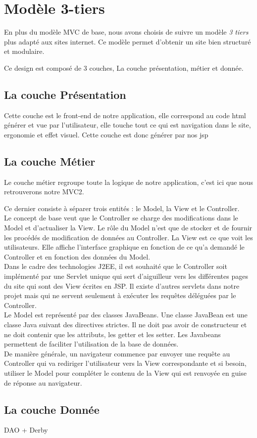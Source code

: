 \section{Modèle 3-tiers}
En plus du modèle MVC de base, nous avons choisis de suivre un modèle \emph{3 tiers} plus adapté aux sites internet.
Ce modèle permet d'obtenir un site bien structuré et modulaire.

Ce design est composé de 3 couches,
La couche présentation, métier et donnée.

\subsection{La couche Présentation}
Cette couche est le front-end de notre application, elle correspond au code html générer et vue par l'utilisateur, elle touche tout ce qui est navigation dans le site, ergonomie et effet visuel.
Cette couche est donc générer par nos jsp

\subsection{La couche Métier}
Le couche métier regroupe toute la logique de notre application, c'est ici que nous retrouverons notre MVC2.

Ce dernier consiste à séparer trois 
entités : le Model, la View et le Controller. \\

Le concept de base veut que le Controller se charge des modifications dans le 
Model et d'actualiser la View. Le rôle du Model n'est que de stocker et de 
fournir les procédés de modification de données au Controller. La View est ce 
que voit les utilisateurs. Elle affiche l'interface graphique en fonction de ce 
qu'a demandé le Controller et en fonction des données du Model. \\

Dans le cadre des technologies J2EE, il est souhaité que le Controller soit 
implémenté par une Servlet unique qui sert d'aiguilleur vers les différentes 
pages du site qui sont des View écrites en JSP. Il existe d'autres servlets 
dans notre projet mais qui ne servent seulement à exécuter les requêtes 
déléguées par le Controller.\\

Le Model est représenté par des classes JavaBeans. Une classe JavaBean est une 
classe Java suivant des directives strictes. Il ne doit pas avoir de 
constructeur et ne doit contenir que les attributs, les getter et les setter. 
Les Javabeans permettent de faciliter l'utilisation de la base de données. \\

De manière générale, un navigateur commence par envoyer une requête au 
Controller qui va rediriger l'utilisateur vers la View correspondante et si 
besoin, utiliser le Model pour compléter le contenu de la View qui est renvoyée 
en guise de réponse au navigateur.


\subsection{La couche Donnée}
DAO + Derby

